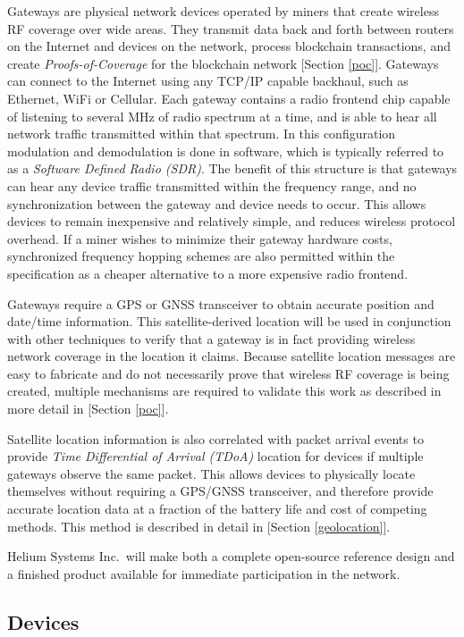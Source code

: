 \documentclass[10pt, nonatbib, nocopyrightspace, reprint]{sigplanconf}
\begin{document}
Gateways are physical network devices operated by miners that create wireless RF coverage over wide areas. They transmit data back and forth between routers on the Internet and devices on the network, process blockchain transactions, and create \emph{Proofs-of-Coverage} for the blockchain network [Section \ref{poc}]. Gateways can connect to the Internet using any TCP/IP capable backhaul, such as Ethernet, WiFi or Cellular. Each gateway contains a radio frontend chip capable of listening to several MHz of radio spectrum at a time, and is able to hear all network traffic transmitted within that spectrum. In this configuration modulation and demodulation is done in software, which is typically referred to as a \emph{Software Defined Radio (SDR)}. The benefit of this structure is that gateways can hear any device traffic transmitted within the frequency range, and no synchronization between the gateway and device needs to occur. This allows devices to remain inexpensive and relatively simple, and reduces wireless protocol overhead. If a miner wishes to minimize their gateway hardware costs, synchronized frequency hopping schemes are also permitted within the specification as a cheaper alternative to a more expensive radio frontend.

Gateways require a GPS or GNSS transceiver to obtain accurate position and date/time information. This satellite-derived location will be used in conjunction with other techniques to verify that a gateway is in fact providing wireless network coverage in the location it claims. Because satellite location messages are easy to fabricate and do not necessarily prove that wireless RF coverage is being created, multiple mechanisms are required to validate this work as described in more detail in [Section \ref{poc}].

Satellite location information is also correlated with packet arrival events to provide \emph{Time Differential of Arrival (TDoA)} location for devices if multiple gateways observe the same packet. This allows devices to physically locate themselves without requiring a GPS/GNSS transceiver, and therefore provide accurate location data at a fraction of the battery life and cost of competing methods. This method is described in detail in [Section \ref{geolocation}].

Helium Systems Inc.\ will make both a complete open-source reference design and a finished product available for immediate participation in the network.

\subsection{Devices}\label{devices}
\end{document}
